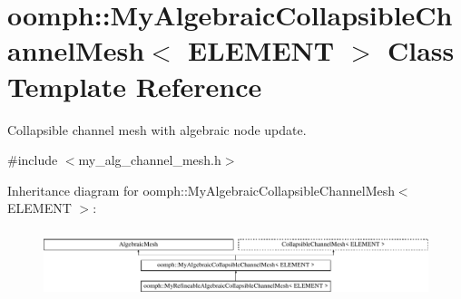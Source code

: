 \hypertarget{classoomph_1_1MyAlgebraicCollapsibleChannelMesh}{}\section{oomph\+:\+:My\+Algebraic\+Collapsible\+Channel\+Mesh$<$ E\+L\+E\+M\+E\+NT $>$ Class Template Reference}
\label{classoomph_1_1MyAlgebraicCollapsibleChannelMesh}


Collapsible channel mesh with algebraic node update.  




{\ttfamily \#include $<$my\+\_\+alg\+\_\+channel\+\_\+mesh.\+h$>$}

Inheritance diagram for oomph\+:\+:My\+Algebraic\+Collapsible\+Channel\+Mesh$<$ E\+L\+E\+M\+E\+NT $>$\+:\begin{figure}[H]
\begin{center}
\leavevmode
\includegraphics[height=2.009569cm]{classoomph_1_1MyAlgebraicCollapsibleChannelMesh}
\end{center}
\end{figure}
